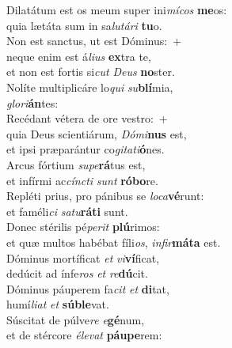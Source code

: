 \evenverse Dilatátum est os meum super ini\textit{mí}\textit{cos} \textbf{me}os:~\*\\
\evenverse quia lætáta sum in sa\textit{lu}\textit{tá}\textit{ri} \textbf{tu}o.\\
\oddverse Non est sanctus, ut est Dóminus:~+\\
\oddverse  neque enim est á\textit{li}\textit{us} \textbf{ex}tra te,~\*\\
\oddverse et non est fortis si\textit{cut} \textit{De}\textit{us} \textbf{no}ster.\\
\evenverse Nolíte multiplicáre lo\textit{qui} \textit{su}\textbf{blí}mia,~\*\\
\evenverse \textit{glo}\textit{ri}\textbf{án}tes:\\
\oddverse Recédant vétera de ore vestro:~+\\
\oddverse  quia Deus scientiárum, \textit{Dó}\textit{mi}\textbf{nus} est,~\*\\
\oddverse et ipsi præparántur co\textit{gi}\textit{ta}\textit{ti}\textbf{ó}nes.\\
\evenverse Arcus fórtium \textit{su}\textit{pe}\textbf{rá}tus est,~\*\\
\evenverse et infírmi ac\textit{cín}\textit{cti} \textit{sunt} \textbf{ró}\textbf{bo}re.\\
\oddverse Repléti prius, pro pánibus se \textit{lo}\textit{ca}\textbf{vé}runt:~\*\\
\oddverse et faméli\textit{ci} \textit{sa}\textit{tu}\textbf{rá}\textbf{ti} sunt.\\
\evenverse Donec stérilis pé\textit{pe}\textit{rit} \textbf{plú}rimos:~\*\\
\evenverse et quæ multos habébat fíli\textit{os}, \textit{in}\textit{fir}\textbf{má}\textbf{ta} est.\\
\oddverse Dóminus mortíficat \textit{et} \textit{vi}\textbf{ví}ficat,~\*\\
\oddverse dedúcit ad ínfe\textit{ros} \textit{et} \textit{re}\textbf{dú}cit.\\
\evenverse Dóminus páuperem fa\textit{cit} \textit{et} \textbf{di}tat,~\*\\
\evenverse humí\textit{li}\textit{at} \textit{et} \textbf{sú}\textbf{ble}vat.\\
\oddverse Súscitat de púlve\textit{re} \textit{e}\textbf{gé}num,~\*\\
\oddverse et de stércore \textit{é}\textit{le}\textit{vat} \textbf{páu}\textbf{pe}rem:\\
